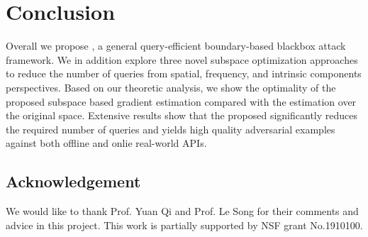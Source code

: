 
\section{Conclusion}
Overall we propose \name, a general query-efficient boundary-based blackbox attack framework. We in addition explore three novel subspace optimization approaches to reduce the number of queries from spatial, frequency, and intrinsic components perspectives. 
Based on our theoretic analysis, we show the optimality of the proposed subspace based gradient estimation compared with the estimation over the original space. 
Extensive results show that the proposed \name significantly reduces the required number of queries and yields high quality adversarial examples against both offline and onlie real-world APIs.

\subsection*{Acknowledgement}
We would like to thank Prof. Yuan Qi and Prof. Le Song for their comments and advice in this project. This work is partially supported by NSF grant No.1910100.

\newpage